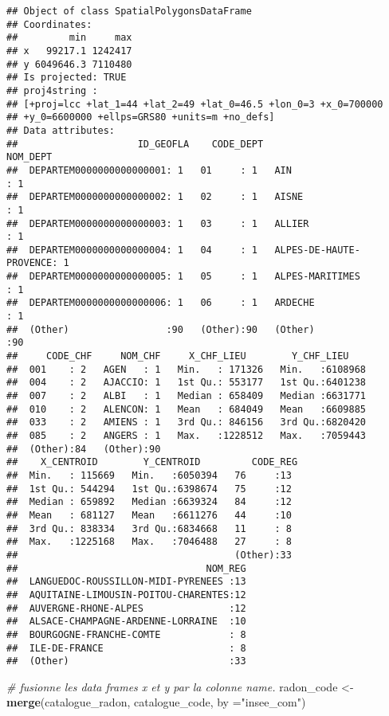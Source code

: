 \documentclass[]{article}
\newenvironment{Shaded}{\begin{snugshade}}{\end{snugshade}}
\newcommand{\KeywordTok}[1]{\textcolor[rgb]{0.13,0.29,0.53}{\textbf{#1}}}
\newcommand{\DataTypeTok}[1]{\textcolor[rgb]{0.13,0.29,0.53}{#1}}
\newcommand{\StringTok}[1]{\textcolor[rgb]{0.31,0.60,0.02}{#1}}
\newcommand{\CommentTok}[1]{\textcolor[rgb]{0.56,0.35,0.01}{\textit{#1}}}
\newcommand{\NormalTok}[1]{#1}
\begin{document}
\begin{verbatim}
## Object of class SpatialPolygonsDataFrame
## Coordinates:
##         min     max
## x   99217.1 1242417
## y 6049646.3 7110480
## Is projected: TRUE 
## proj4string :
## [+proj=lcc +lat_1=44 +lat_2=49 +lat_0=46.5 +lon_0=3 +x_0=700000
## +y_0=6600000 +ellps=GRS80 +units=m +no_defs]
## Data attributes:
##                     ID_GEOFLA    CODE_DEPT                     NOM_DEPT 
##  DEPARTEM0000000000000001: 1   01     : 1   AIN                    : 1  
##  DEPARTEM0000000000000002: 1   02     : 1   AISNE                  : 1  
##  DEPARTEM0000000000000003: 1   03     : 1   ALLIER                 : 1  
##  DEPARTEM0000000000000004: 1   04     : 1   ALPES-DE-HAUTE-PROVENCE: 1  
##  DEPARTEM0000000000000005: 1   05     : 1   ALPES-MARITIMES        : 1  
##  DEPARTEM0000000000000006: 1   06     : 1   ARDECHE                : 1  
##  (Other)                 :90   (Other):90   (Other)                :90  
##     CODE_CHF     NOM_CHF     X_CHF_LIEU        Y_CHF_LIEU     
##  001    : 2   AGEN   : 1   Min.   : 171326   Min.   :6108968  
##  004    : 2   AJACCIO: 1   1st Qu.: 553177   1st Qu.:6401238  
##  007    : 2   ALBI   : 1   Median : 658409   Median :6631771  
##  010    : 2   ALENCON: 1   Mean   : 684049   Mean   :6609885  
##  033    : 2   AMIENS : 1   3rd Qu.: 846156   3rd Qu.:6820420  
##  085    : 2   ANGERS : 1   Max.   :1228512   Max.   :7059443  
##  (Other):84   (Other):90                                      
##    X_CENTROID        Y_CENTROID         CODE_REG 
##  Min.   : 115669   Min.   :6050394   76     :13  
##  1st Qu.: 544294   1st Qu.:6398674   75     :12  
##  Median : 659892   Median :6639324   84     :12  
##  Mean   : 681127   Mean   :6611276   44     :10  
##  3rd Qu.: 838334   3rd Qu.:6834668   11     : 8  
##  Max.   :1225168   Max.   :7046488   27     : 8  
##                                      (Other):33  
##                                 NOM_REG  
##  LANGUEDOC-ROUSSILLON-MIDI-PYRENEES :13  
##  AQUITAINE-LIMOUSIN-POITOU-CHARENTES:12  
##  AUVERGNE-RHONE-ALPES               :12  
##  ALSACE-CHAMPAGNE-ARDENNE-LORRAINE  :10  
##  BOURGOGNE-FRANCHE-COMTE            : 8  
##  ILE-DE-FRANCE                      : 8  
##  (Other)                            :33
\end{verbatim}

\begin{Shaded}
\begin{Highlighting}[]
\CommentTok{# fusionne les data frames x et y par la colonne name.}
\NormalTok{radon_code <-}\KeywordTok{merge}\NormalTok{(catalogue_radon, catalogue_code, }\DataTypeTok{by =}\StringTok{"insee_com"}\NormalTok{)}
\end{Highlighting}
\end{Shaded}
\end{document}
